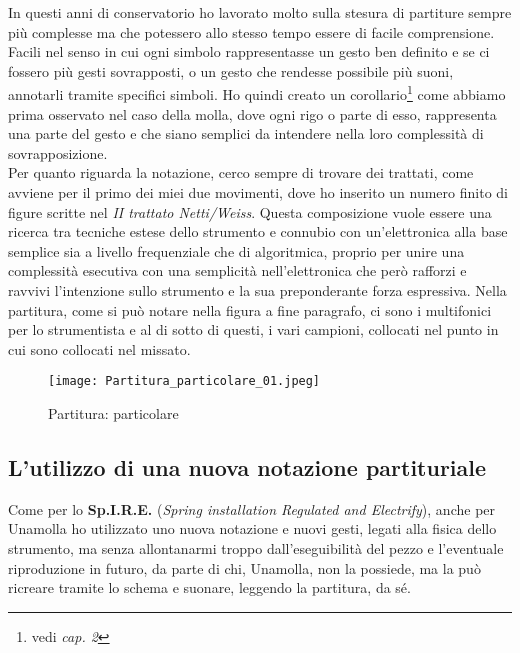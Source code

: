 In questi anni di conservatorio ho lavorato molto sulla stesura di partiture sempre più complesse ma che potessero allo stesso tempo essere di facile comprensione. Facili nel senso in cui ogni simbolo rappresentasse un gesto ben definito e se ci fossero più gesti sovrapposti, o un gesto che rendesse possibile più suoni, annotarli tramite specifici simboli. 
Ho quindi creato un corollario\footnote{vedi \textit{cap. 2}} come abbiamo prima osservato nel caso della molla, dove ogni rigo o parte di esso, rappresenta una parte del gesto e che siano semplici da intendere nella loro complessità di sovrapposizione. \\
Per quanto riguarda la notazione, cerco sempre di trovare dei trattati, come avviene per il primo dei miei due movimenti, dove ho inserito un numero finito di figure scritte nel \textit{II trattato Netti/Weiss}. Questa composizione vuole essere una ricerca tra tecniche estese dello strumento e connubio con un’elettronica alla base semplice sia a livello frequenziale che di algoritmica, proprio per unire una complessità esecutiva con una semplicità nell’elettronica che però rafforzi e ravvivi l’intenzione sullo strumento e la sua preponderante forza espressiva. Nella partitura, come si può notare nella figura a fine paragrafo, ci sono i multifonici per lo strumentista e al di sotto di questi, i vari campioni, collocati nel punto in cui sono collocati nel missato.
\begin{figure}

\begin{center}

\texttt{[image: Partitura\_particolare\_01.jpeg]}

\caption{Partitura: particolare}

\label{fig:01_Partitura_particolare_01}

\end{center}

\end{figure}



\subsection{L'utilizzo di una nuova notazione partituriale}

Come per lo \textbf{Sp.I.R.E.} (\textit{Spring installation Regulated and Electrify}), anche per Unamolla ho utilizzato uno nuova notazione e nuovi gesti, legati alla fisica dello strumento, ma senza allontanarmi troppo dall'eseguibilità del pezzo e l'eventuale riproduzione in futuro, da parte di chi, Unamolla, non la possiede, ma la può ricreare tramite lo schema e suonare, leggendo la partitura, da sé.

